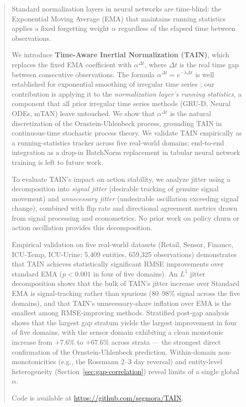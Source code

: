 \documentclass[11pt,a4paper]{article}
\begin{document}
\begin{abstract}
Standard normalization layers in neural networks are time-blind: the Exponential
Moving Average (EMA) that maintains running statistics applies a fixed forgetting
weight $\alpha$ regardless of the elapsed time between observations.

We introduce \textbf{Time-Aware Inertial Normalization (TAIN)}, which replaces
the fixed EMA coefficient with $\alpha^{\Delta t}$, where $\Delta t$ is the real
time gap between consecutive observations. The formula
$\alpha^{\Delta t} = e^{-\lambda \Delta t}$ is well established for exponential
smoothing of irregular time series \citep{wright1986,zumbach2001operators};
our contribution is applying it to the \emph{normalization layer's running
statistics}, a component that all prior irregular time series methods
(GRU-D, Neural ODEs, mTAN) leave untouched. We show that $\alpha^{\Delta t}$
is the natural discretization of the Ornstein-Uhlenbeck process, grounding
TAIN in continuous-time stochastic process theory. We validate TAIN empirically
as a running-statistics tracker across five real-world domains; end-to-end
integration as a drop-in BatchNorm replacement in tabular neural network
training is left to future work.

To evaluate TAIN's impact on action stability, we analyze jitter using a
decomposition into \emph{signal jitter} (desirable tracking of genuine
signal movement) and \emph{unnecessary jitter} (undesirable oscillation exceeding
signal change), combined with flip rate and directional agreement
metrics drawn from signal processing and econometrics. No prior work on policy
churn \citep{schaul2022policy} or action oscillation \citep{chen2021action}
provides this decomposition.

Empirical validation on five real-world datasets (Retail, Sensor, Finance, ICU-Temp, ICU-Urine;
5{,}409 entities, 659{,}325 observations) demonstrates that TAIN achieves statistically
significant RMSE improvements over standard EMA ($p < 0.001$ in four of five
domains). An $L^1$ jitter decomposition shows that the bulk of TAIN's jitter
increase over Standard EMA is signal-tracking rather than spurious
(80--98\% signal across the five domains), and that TAIN's unnecessary-share
inflation over EMA is the smallest among RMSE-improving methods. Stratified post-gap analysis shows that the largest gap
stratum yields the largest improvement in four of five domains, with the sensor
domain exhibiting a clean monotonic increase from $+7.6\%$ to $+67.6\%$ across
strata --- the strongest direct confirmation of the Ornstein-Uhlenbeck prediction.
Within-domain non-monotonicities (e.g., the Rossmann 2--3 day reversal) and
entity-level heterogeneity (Section~\ref{sec:gap-correlation}) reveal limits of
a single global $\alpha$.

Code is available at \url{https://github.com/segmora/TAIN}.
\end{abstract}
\end{document}
